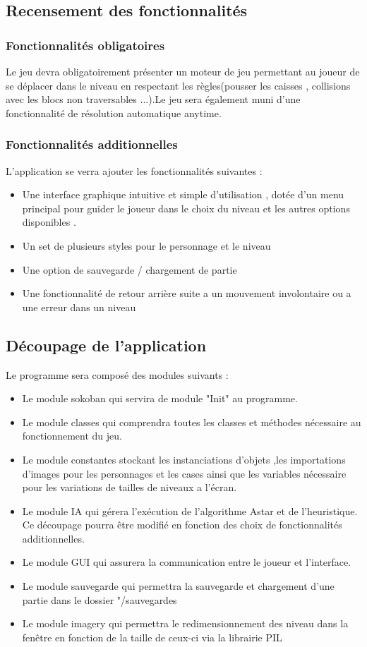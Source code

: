 \documentclass{article}
\begin{document}
		\subsection{Recensement des fonctionnalités}
		\vspace{1cm}
			\subsubsection{Fonctionnalités obligatoires}
			Le jeu devra obligatoirement présenter un moteur de jeu permettant au joueur de se déplacer dans le niveau en respectant les règles(pousser les caisses , collisions avec les blocs non traversables ...).Le jeu sera également muni d'une fonctionnalité de résolution automatique anytime.
			\subsubsection{Fonctionnalités additionnelles}
			L'application se verra ajouter les fonctionnalités suivantes :
			\begin{itemize}
			\item Une interface graphique intuitive et simple d'utilisation , dotée d'un menu principal pour guider le joueur dans le choix du niveau et les autres options disponibles .
			\item Un set de plusieurs styles pour le personnage et le niveau 
			\item Une option de sauvegarde / chargement de partie
			\item Une fonctionnalité de retour arrière suite a un mouvement involontaire ou a une erreur dans un niveau 
			\end{itemize}
		\subsection{Découpage de l'application}
		\vspace{1cm}
	Le programme sera composé des modules suivants :
		\begin{itemize}
\item Le module sokoban qui servira de module "Init" au programme.
\item Le module classes qui comprendra toutes les classes et méthodes nécessaire
au fonctionnement du jeu.
\item Le module constantes stockant les instanciations d'objets ,les importations d’images pour les personnages
et les cases ainsi que les variables nécessaire pour les variations
de tailles de niveaux a l’écran.
\item Le module IA qui gérera l'exécution de l'algorithme Astar et de l'heuristique.
Ce découpage pourra être modifié en fonction des choix de fonctionnalités additionnelles.
\item Le module GUI qui assurera la communication entre le joueur et l'interface.
\item Le module sauvegarde qui permettra la sauvegarde et chargement d'une partie dans le dossier "/sauvegardes
\item Le module imagery qui permettra le redimensionnement des niveau dans la fenêtre en fonction de la taille de ceux-ci via la librairie PIL
		\end{itemize}
\end{document}
